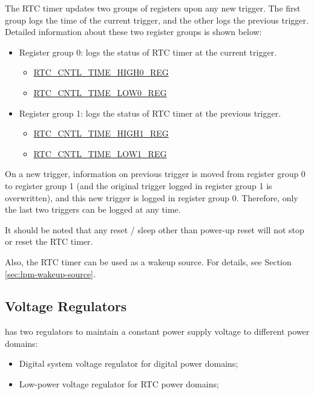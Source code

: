 \documentclass[main\_\_EN.tex]{subfiles}
\begin{document}
The RTC timer updates two groups of registers upon any new trigger. The first group logs the time of the current trigger, and the other logs the previous trigger. Detailed information about these two register groups is shown below:
\begin{itemize}
    \item Register group 0: logs the status of RTC timer at the current trigger.
    \begin{itemize}
        \item \hyperref[regdesc:RTCCNTLTIMEHIGH0REG]{RTC\_CNTL\_TIME\_HIGH0\_REG}
        \item \hyperref[regdesc:RTCCNTLTIMELOW0REG]{RTC\_CNTL\_TIME\_LOW0\_REG}
    \end{itemize}
    \item Register group 1: logs the status of RTC timer at the previous trigger.
    \begin{itemize}
    \item \hyperref[regdesc:RTCCNTLTIMEHIGH1REG]{RTC\_CNTL\_TIME\_HIGH1\_REG}
    \item \hyperref[regdesc:RTCCNTLTIMELOW1REG]{RTC\_CNTL\_TIME\_LOW1\_REG}
    \end{itemize}
\end{itemize}

On a new trigger, information on previous trigger is moved from register group 0 to register group 1 (and the original trigger logged in register group 1 is overwritten), and this new trigger is logged in register group 0. Therefore, only the last two triggers can be logged at any time.

It should be noted that any reset / sleep other than power-up reset will not stop or reset the RTC timer.

Also, the RTC timer can be used as a wakeup source. For details, see Section \ref{sec:lpm-wakeup-source}.

\subsection{Voltage Regulators}

\chipname{} has two regulators to maintain a constant power supply voltage to different power domains:
\begin{itemize}
    \item Digital system voltage regulator for digital power domains;
    \item Low-power voltage regulator for RTC power domains;
\end{itemize}
\end{document}

